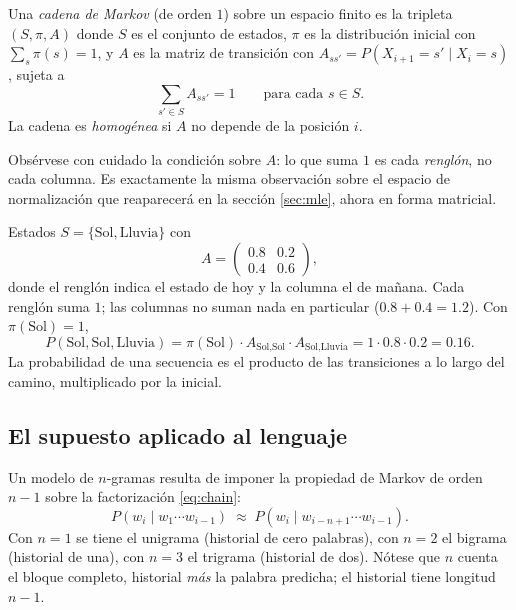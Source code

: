 \documentclass[11pt,letterpaper]{article}
\begin{document}
\begin{definicion}
Una \emph{cadena de Markov} (de orden $1$) sobre un espacio finito es la
tripleta $(S,\pi,A)$ donde $S$ es el conjunto de estados, $\pi$ es la
distribución inicial con $\sum_{s}\pi(s)=1$, y $A$ es la matriz de transición
con $A_{ss'}=P(X_{i+1}=s'\mid X_i=s)$, sujeta a
\[
\sum_{s'\in S} A_{ss'} = 1 \qquad\text{para cada } s\in S .
\]
La cadena es \emph{homogénea} si $A$ no depende de la posición $i$.
\end{definicion}

Obsérvese con cuidado la condición sobre $A$: lo que suma $1$ es cada
\emph{renglón}, no cada columna. Es exactamente la misma observación sobre el
espacio de normalización que reaparecerá en la sección \ref{sec:mle}, ahora en
forma matricial.

\begin{ejemplo}
Estados $S=\{\text{Sol},\text{Lluvia}\}$ con
\[
A=\begin{pmatrix} 0.8 & 0.2 \\ 0.4 & 0.6 \end{pmatrix},
\]
donde el renglón indica el estado de hoy y la columna el de mañana. Cada renglón
suma $1$; las columnas no suman nada en particular ($0.8+0.4=1.2$). Con
$\pi(\text{Sol})=1$,
\[
P(\text{Sol},\text{Sol},\text{Lluvia}) = \pi(\text{Sol})\cdot
A_{\text{Sol},\text{Sol}}\cdot A_{\text{Sol},\text{Lluvia}} = 1\cdot 0.8\cdot
0.2 = 0.16 .
\]
La probabilidad de una secuencia es el producto de las transiciones a lo largo
del camino, multiplicado por la inicial.
\end{ejemplo}

\subsection{El supuesto aplicado al lenguaje}

Un modelo de $n$-gramas resulta de imponer la propiedad de Markov de orden $n-1$
sobre la factorización \eqref{eq:chain}:
\begin{equation}\label{eq:markov}
P(w_i \mid w_1\cdots w_{i-1}) \;\approx\; P(w_i \mid w_{i-n+1}\cdots w_{i-1}).
\end{equation}
Con $n=1$ se tiene el unigrama (historial de cero palabras), con $n=2$ el
bigrama (historial de una), con $n=3$ el trigrama (historial de dos). Nótese que
$n$ cuenta el bloque completo, historial \emph{más} la palabra predicha; el
historial tiene longitud $n-1$.
\end{document}
